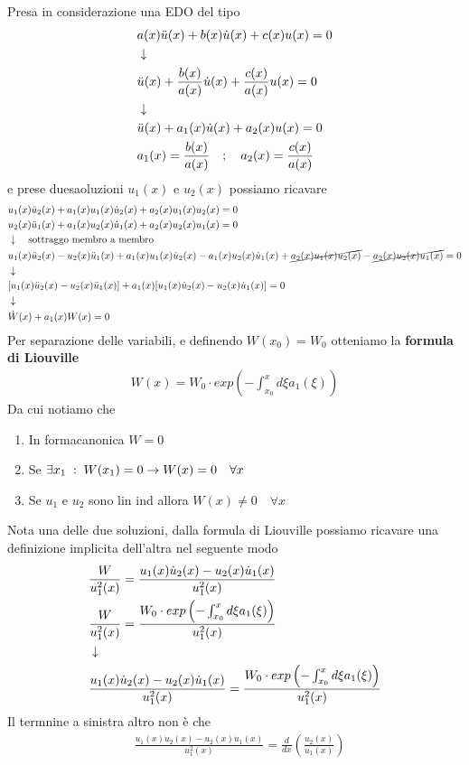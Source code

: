 Presa in considerazione una EDO del tipo
\begin{align}
	&a(x) \ddot{u}(x) + b(x) \dot{u}(x) + c(x) u(x) = 0 \\ &\downarrow \nonumber \\
	&\ddot{u}(x) + \frac{b(x)}{a(x)} \dot{u}(x) + \frac{c(x)}{a(x)} u(x) = 0\nonumber \\ &\downarrow \nonumber \\
	&\ddot{u}(x) + a_1(x) \dot{u}(x) + a_2(x) u(x) = 0 \\
	&a_1(x) =  \frac{b(x)}{a(x)} \quad ; \quad a_2(x)=\frac{c(x)}{a(x)}
\end{align}
e prese duesaoluzioni $u_1(x)$ e $u_2(x)$ possiamo ricavare
\begin{align}
	&u_1(x)\ddot{u}_2(x) + a_1(x) u_1(x)\dot{u}_2(x) + a_2(x) u_1(x)u_2(x) = 0 \\
	&u_2(x)\ddot{u}_1(x) + a_1(x) u_2(x)\dot{u}_1(x) + a_2(x) u_2(x)u_1(x) = 0\\ &\downarrow \quad \text{sottraggo membro a membro} \nonumber \\
	&u_1(x)\ddot{u}_2(x) - u_2(x)\ddot{u}_1(x) + a_1(x) u_1(x)\dot{u}_2(x) - a_1(x) u_2(x)\dot{u}_1(x) + \cancel{ a_2(x) u_1(x)u_2(x)} - \cancel{a_2(x) u_2(x)u_1(x)} = 0 \nonumber \\ &\downarrow \nonumber \\
	&[u_1(x)\ddot{u}_2(x) - u_2(x)\ddot{u}_1(x)]+ a_1(x) [  u_1(x)\dot{u}_2(x) - u_2(x)\dot{u}_1(x)] = 0\nonumber \\ &\downarrow \nonumber \\
	&\dot{W}(x) + a_1(x)W(x) = 0
\end{align}
Per separazione delle variabili, e definendo $W(x_0)=W_0$ otteniamo la \textbf{formula di Liouville}
\begin{align}
	W(x) = W_0\cdot exp\left( -\int_{x_0}^{x} d\xi a_1(\xi) \right)
\end{align}
Da cui notiamo che
\begin{enumerate}
	\item In formacanonica $W=0$
	\item Se $\exists x_1 \; : \; W(x_1) = 0 \to W(x) = 0\quad\forall x$
	\item Se $u_1$ e $u_2$ sono lin ind allora $W(x) \neq 0 \quad \forall x$
\end{enumerate}
Nota una delle due soluzioni, dalla formula di Liouville possiamo ricavare una definizione implicita dell'altra nel seguente modo
\begin{align}
	&\frac{W}{u_1^2(x)} = \frac{u_1(x)\dot{u}_2(x) - u_2(x)\dot{u}_1(x)}{u_1^2(x)}\\
	&\frac{W}{u_1^2(x)} = \frac{W_0\cdot exp\left( -\int_{x_0}^{x} d\xi a_1(\xi) \right)}{u_1^2(x)} \\ &\downarrow \nonumber \\
	&\frac{u_1(x)\dot{u}_2(x) - u_2(x)\dot{u}_1(x)}{u_1^2(x)} = \frac{W_0\cdot exp\left( -\int_{x_0}^{x} d\xi a_1(\xi) \right)}{u_1^2(x)}
\end{align}
Il termnine a sinistra altro non è che 
\begin{align}
	&\frac{u_1(x)\dot{u}_2(x) - u_2(x)\dot{u}_1(x)}{u_1^2(x)} = \frac{d}{dx} \left( \frac{u_2(x)}{u_1(x)} \right)
\end{align}
